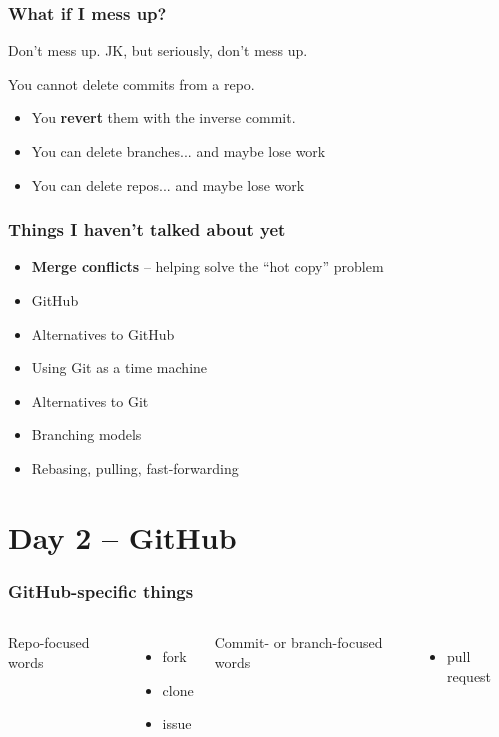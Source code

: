 \documentclass[14pt,aspectratio=1610]{beamer} %
\newcommand{\fframe}[2]{
   \begin{frame}
\frametitle{#1}
#2
\end{frame}
}
\begin{document}
\fframe{What if I mess up?}
{
	Don't mess up.   JK, but seriously, don't mess up.

\vspace{\baselineskip}

	You cannot delete commits from a repo.  
	\begin{itemize}
		\item You {\bf revert} them with the inverse commit.   
		\item You can delete branches... and maybe lose work
		\item You can delete repos... and maybe lose work
	\end{itemize}
}









\fframe{Things I haven't talked about yet}
{
	\begin{itemize}
		\item {\bf Merge conflicts} -- helping solve the ``hot copy'' problem
		\item GitHub
		\item Alternatives to GitHub
		\item Using Git as a time machine
		\item Alternatives to Git
		\item Branching models
		\item Rebasing, pulling, fast-forwarding
	\end{itemize}
}


\section{Day 2 -- GitHub}

\fframe{GitHub-specific things}
{
		\begin{columns}[t]
	\column{2in}
	Repo-focused words
	\begin{itemize}
		\item fork
		\item clone
		\item issue


		
	\end{itemize}

	\column{2in}
	Commit- or branch-focused words
	\begin{itemize}		
		\item pull request
	\end{itemize}
	\end{columns}
}
\end{document}
